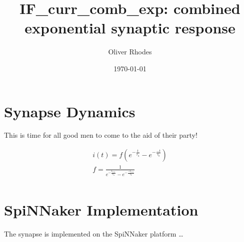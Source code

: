 \documentclass[12pt]{article}
\title{IF\_curr\_comb\_exp: combined exponential synaptic response}
\author{Oliver Rhodes}
\date{\today}
\begin{document}
\maketitle

\section{Synapse Dynamics}
This is time for all good men to come to the aid of their party!

\begin{eqnarray}
i(t) = f(e^{-\frac{t}{\tau_a}} - e^{-\frac{-t}{\tau_b}}) \\
f = \frac{1}{e^{-\frac{t_{rise}}{\tau_a}} - e^{-\frac{-t_{rise}}{\tau_b}}} \\
\label{combined_exponential_response}
\end{eqnarray}

\section{SpiNNaker Implementation}
The synapse is implemented on the SpiNNaker platform \ldots
\end{document}
